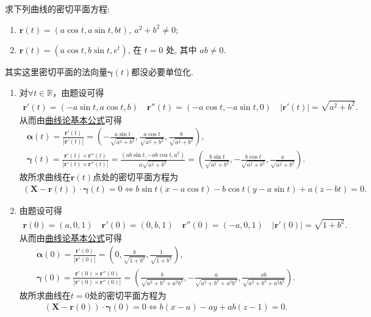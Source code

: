 \documentclass[../../main.tex]{subfiles}%
\begin{document}
\begin{example}
求下列曲线的密切平面方程:
\begin{enumerate}[(1)]
\item $\bm{r}(t) = (a\cos t, a\sin t, bt),\ a^2 + b^2 \neq 0$;
\item $\bm{r}(t) = (a\cos t, b\sin t, e^t)$, 在 $t=0$ 处, 其中 $ab \neq 0$.
\end{enumerate}
\begin{remark}
其实这里密切平面的法向量$\bm{\gamma}(t)$都没必要单位化.
\end{remark}
\end{example}
\begin{solution}
\begin{enumerate}[(1)]
\item 对$\forall t\in \mathbb{R}$，由题设可得
\begin{align*}
\bm{r}'(t) = \left(-a\sin t,a\cos t,b\right) \quad \bm{r}''(t) = \left(-a\cos t,-a\sin t,0\right) \quad |\bm{r}'(t)| = \sqrt{a^2+b^2}.
\end{align*}
从而由\hyperref[theorem:曲线论基本公式]{曲线论基本公式}可得
\begin{gather*}
\bm{\alpha}(t) = \frac{\bm{r}'(t)}{|\bm{r}'(t)|} = \left(-\frac{a\sin t}{\sqrt{a^2+b^2}},\frac{a\cos t}{\sqrt{a^2+b^2}},\frac{b}{\sqrt{a^2+b^2}}\right), \\
\bm{\gamma}(t) = \frac{\bm{r}'(t) \times \bm{r}''(t)}{|\bm{r}'(t) \times \bm{r}''(t)|} = \frac{\left(ab\sin t,-ab\cos t,a^2\right)}{a\sqrt{a^2+b^2}} = \left(\frac{b\sin t}{\sqrt{a^2+b^2}},-\frac{b\cos t}{\sqrt{a^2+b^2}},\frac{a}{\sqrt{a^2+b^2}}\right).
\end{gather*}
故所求曲线在$\bm{r}(t)$点处的密切平面方程为
\begin{align*}
\left(\bm{X}-\bm{r}(t)\right) \cdot \bm{\gamma}(t) = 0 \Longleftrightarrow b\sin t\left(x-a\cos t\right)-b\cos t\left(y-a\sin t\right)+a\left(z-bt\right)=0.
\end{align*}
\item 由题设可得
\begin{align*}
\bm{r}(0) = \left(a,0,1\right) \quad \bm{r}'(0) = \left(0,b,1\right) \quad \bm{r}''(0) = \left(-a,0,1\right) \quad |\bm{r}'(0)| = \sqrt{1+b^2}.
\end{align*}
从而由\hyperref[theorem:曲线论基本公式]{曲线论基本公式}可得
\begin{gather*}
\bm{\alpha}(0) = \frac{\bm{r}'(0)}{|\bm{r}'(0)|} = \left(0,\frac{b}{\sqrt{1+b^2}},\frac{1}{\sqrt{1+b^2}}\right), \\
\bm{\gamma}(0) = \frac{\bm{r}'(0) \times \bm{r}''(0)}{|\bm{r}'(0) \times \bm{r}''(0)|} = \left(\frac{b}{\sqrt{a^2+b^2+a^2b^2}},-\frac{a}{\sqrt{a^2+b^2+a^2b^2}},\frac{ab}{\sqrt{a^2+b^2+a^2b^2}}\right).
\end{gather*}
故所求曲线在$t=0$处的密切平面方程为
\begin{align*}
\left(\bm{X}-\bm{r}(0)\right) \cdot \bm{\gamma}(0) = 0 \Longleftrightarrow b\left(x-a\right)-ay+ab\left(z-1\right)=0.
\end{align*}
\end{enumerate}

\end{solution}
\end{document}
